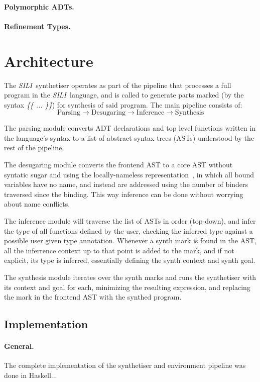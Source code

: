 \documentclass{llncs}
\newcommand{\mypara}[1]{\paragraph{\textbf{#1}.}}
\newcommand{\synname}{\emph{SILI}}
\begin{document}
\mypara{Polymorphic ADTs}

\mypara{Refinement Types}



\section{Architecture}\label{sec:architecture}

The \synname\ synthetiser operates as part of the pipeline that processes a
full program in the \synname\ language, and is called to generate parts marked
(by the syntax \emph{\{\{ ... \}\}}) for
synthesis of said program. The main pipeline consists of:
\[
    \textrm{Parsing} \rightarrow \textrm{Desugaring} \rightarrow \textrm{Inference} \rightarrow \textrm{Synthesis}
\]

The parsing module converts ADT declarations and top level functions written in
the language's syntax to a list of abstract syntax trees (ASTs) understood by the rest of the
pipeline.

The desugaring module converts the frontend AST to a core AST without syntatic
sugar and using the locally-nameless representation~\cite{locally nameless}, in
which all bound variables have no name, and instead are addressed using the
number of binders traversed since the binding.
This way inference can be done without worrying about name conflicts.

The inference module will traverse the list of ASTs in order (top-down), and
infer the type of all functions defined by the user, checking the inferred
type against a possible user given type annotation. Whenever a synth mark is
found in the AST, all the inferrence context up to that point is added to the
mark, and if not explicit, its type is inferred, essentially defining the synth
context and synth goal.

The synthesis module iterates over the synth marks and runs the synthetiser with
its context and goal for each, minimizing the resulting expression, and
replacing the mark in the frontend AST with the synthed program.


\subsection{Implementation}

\mypara{General} The complete implementation of the synthetiser and environment
pipeline was done in Haskell...
\end{document}
